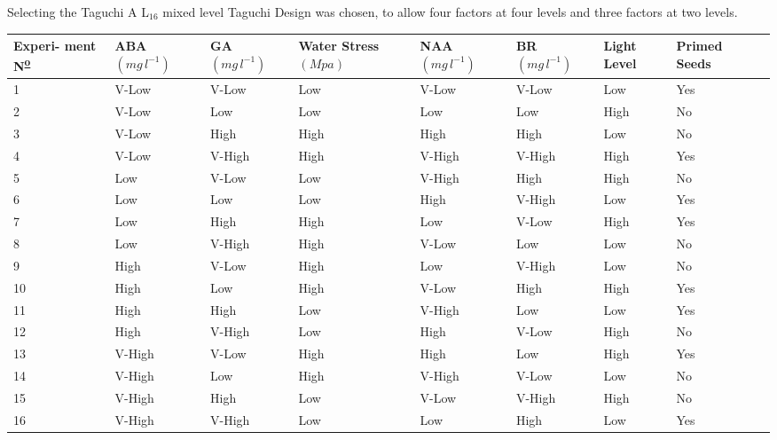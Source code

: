 \documentclass[10pt]{beamer}
\begin{document}
\begin{frame}{Selecting the Taguchi}
	A L$_{16}$ mixed level Taguchi Design was chosen, to allow four factors at four levels and three factors at two levels.
\begin{table}[htpb]\scriptsize
\centering
\begin{tabular}{p{1cm} |  p{1cm}   p{1cm}  p{1cm}   p{1cm}  p{1cm}   p{1cm} p{1cm}   p{1cm}}
\hline
\textbf{Experi- ment N\textsuperscript{\underline{o}}} & \textbf{ABA  $(mg\, l^{-1})$}   & \textbf{GA  $(mg\, l^{-1})$}  & \textbf{Water Stress  $(Mpa)$}  & \textbf{NAA  $(mg\, l^{-1})$}  & \textbf{BR  $(mg\, l^{-1})$} & \textbf{Light Level} & \textbf{Primed Seeds}\\
\hline
1 & V-Low  & V-Low & Low & V-Low  & V-Low & Low & Yes\\
2 & V-Low  & Low & Low & Low  & Low & High & No\\
3 & V-Low  & High & High & High  & High & Low & No\\
4 & V-Low  & V-High & High & V-High  & V-High & High & Yes\\
5 & Low  & V-Low & Low & V-High  & High & High & No\\
6 & Low  & Low & Low & High  & V-High & Low & Yes\\
7 & Low  & High & High & Low  & V-Low & High & Yes\\
8 & Low  & V-High & High & V-Low  & Low & Low & No\\
9 & High  & V-Low & High & Low  & V-High & Low & No\\
10 & High  & Low & High & V-Low  & High & High & Yes\\
11 & High  & High & Low & V-High  & Low & Low & Yes\\
12 & High  & V-High & Low & High  & V-Low & High & No\\
13 & V-High  & V-Low & High & High  & Low & High & Yes\\
14 & V-High  & Low & High & V-High  & V-Low & Low & No\\
15 & V-High  & High & Low & V-Low  & V-High & High & No\\
16 & V-High  & V-High & Low & Low  & High & Low & Yes\\
\hline
\end{tabular}
\end{table}
\end{frame}
\end{document}
